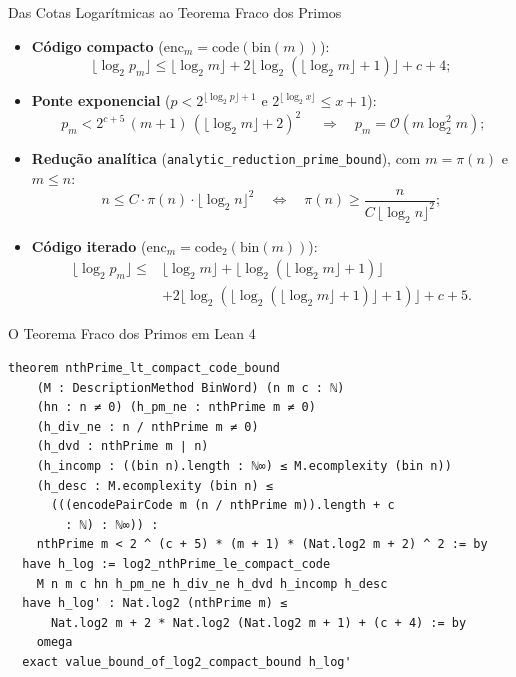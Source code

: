 \documentclass[10pt, aspectratio=43]{beamer}
\begin{document}
\begin{frame}{Das Cotas Logarítmicas ao Teorema Fraco dos Primos}
    \small
    \begin{itemize}
        \item \textbf{Código compacto} ($\text{enc}_m = \text{code}(\text{bin}(m))$):
        \begin{equation*}
            \lfloor\log_2 p_m\rfloor \le \lfloor\log_2 m\rfloor + 2\lfloor\log_2(\lfloor\log_2 m\rfloor + 1)\rfloor + c + 4;
        \end{equation*}
        \item \textbf{Ponte exponencial} ($p < 2^{\lfloor\log_2 p\rfloor + 1}$ e $2^{\lfloor\log_2 x\rfloor} \le x + 1$):
        \begin{equation*}
            \boxed{\;p_m < 2^{c+5}\,(m + 1)\,(\lfloor\log_2 m\rfloor + 2)^2\;} \quad \Longrightarrow \quad p_m = \mathcal{O}(m \log_2^2 m);
        \end{equation*}
        \item \textbf{Redução analítica} (\texttt{analytic\_reduction\_prime\_bound}), com $m = \pi(n)$ e $m \le n$:
        \begin{equation*}
            n \le C \cdot \pi(n) \cdot \lfloor\log_2 n\rfloor^2 \quad\Longleftrightarrow\quad \pi(n) \ge \frac{n}{C\,\lfloor\log_2 n\rfloor^2};
        \end{equation*}
        \item \textbf{Código iterado} ($\text{enc}_m = \text{code}_2(\text{bin}(m))$):
        \begin{align*}
            \lfloor\log_2 p_m\rfloor \le{} & \lfloor\log_2 m\rfloor + \lfloor\log_2(\lfloor\log_2 m\rfloor + 1)\rfloor \\
            & + 2\lfloor\log_2(\lfloor\log_2(\lfloor\log_2 m\rfloor + 1)\rfloor + 1)\rfloor + c + 5.
        \end{align*}
    \end{itemize}
\end{frame}

\begin{frame}[fragile]{O Teorema Fraco dos Primos em Lean 4}
\begin{lstlisting}[language=Lean4, basicstyle=\ttfamily\scriptsize\color{pucblue!90!black}]
theorem nthPrime_lt_compact_code_bound
    (M : DescriptionMethod BinWord) (n m c : ℕ)
    (hn : n ≠ 0) (h_pm_ne : nthPrime m ≠ 0)
    (h_div_ne : n / nthPrime m ≠ 0)
    (h_dvd : nthPrime m ∣ n)
    (h_incomp : ((bin n).length : ℕ∞) ≤ M.ecomplexity (bin n))
    (h_desc : M.ecomplexity (bin n) ≤
      (((encodePairCode m (n / nthPrime m)).length + c
        : ℕ) : ℕ∞)) :
    nthPrime m < 2 ^ (c + 5) * (m + 1) * (Nat.log2 m + 2) ^ 2 := by
  have h_log := log2_nthPrime_le_compact_code
    M n m c hn h_pm_ne h_div_ne h_dvd h_incomp h_desc
  have h_log' : Nat.log2 (nthPrime m) ≤
      Nat.log2 m + 2 * Nat.log2 (Nat.log2 m + 1) + (c + 4) := by
    omega
  exact value_bound_of_log2_compact_bound h_log'
\end{lstlisting}
\end{frame}
\end{document}
